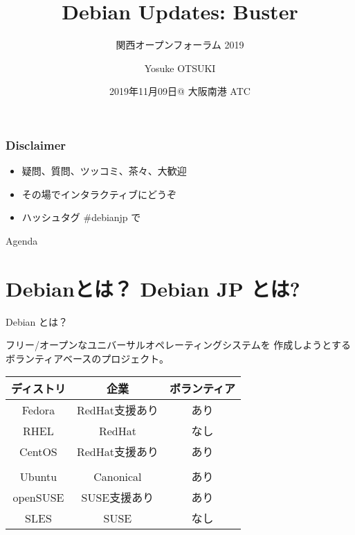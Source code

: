 \documentclass[cjk,c,squeeze,shrink,dvipdfmx,12pt]{beamer}
\title[Debian Updates: Buster]{Debian Updates: Buster}
\subtitle[KOF 2019]{関西オープンフォーラム 2019}
\author[おおつき]{Yosuke OTSUKI}
\institute[Debian JP Project]{%
  {\footnotesize{%
      Debian JP Project/関西Debian勉強会
    }}
}
\date[2019/08/03]{%
  {\tiny{2019年11月09日@ 大阪南港 ATC}}
}
\begin{document}
\takahashi[80]{　}
{%
  \begin{frame}
    \maketitle
  \end{frame}
}

\begin{frame}[fragile]
  \frametitle{Disclaimer}
  \begin{itemize}
  \item 疑問、質問、ツッコミ、茶々、\alert{大歓迎}
  \item その場でインタラクティブにどうぞ
  \item ハッシュタグ \alert{\#debianjp} で
  \end{itemize}
\end{frame}

\begin{frame}[fragile]{Agenda}
  \tableofcontents
\end{frame}


\section{Debianとは？ Debian JP とは?}


\begin{frame}[fragile]{Debian とは？}

  \alert{フリー/オープン}な\alert{ユニバーサル}オペレーティングシステムを
  作成しようとするボランティアベースのプロジェクト。

  \vfill
  \centering
  \begin{tabular}{|c|c|c|}
    \hline
    ディストリ & 企業 & ボランティア \\ \hline
    Fedora & RedHat支援あり & あり  \\ \hline
    RHEL & RedHat & なし  \\ \hline
    CentOS & RedHat支援あり & あり \\ \hline
    \color{red}{Debian}  & \color{red}{なし} & \color{red}{あり} \\ \hline
    Ubuntu  & Canonical & あり \\ \hline
    openSUSE & SUSE支援あり & あり \\ \hline
    SLES & SUSE & なし \\ \hline
  \end{tabular}
  \vfill
\end{frame}
\end{document}
